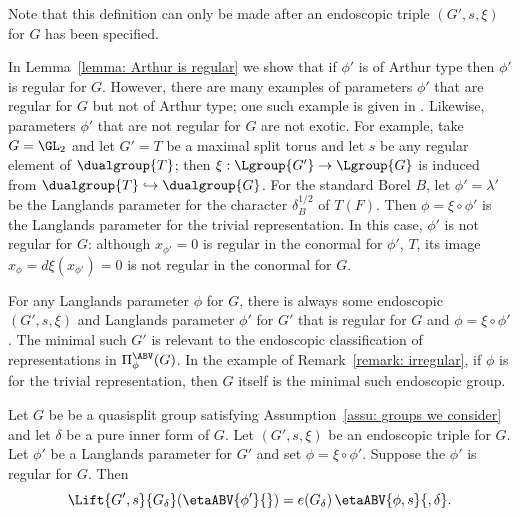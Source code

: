 \documentclass[11pt,letterpaper]{amsart}
\numberwithin{equation}{section}
\begin{document}
Note that this definition can only be made after an endoscopic triple $(G',s,\xi)$ for $G$ has been specified.


\begin{remark}\label{remark: irregular}
In Lemma~\ref{lemma: Arthur is regular} we show that if $\phi'$ is of Arthur type then $\phi'$ is regular for $G$.
However, there are many examples of parameters $\phi'$ that are regular for $G$ but not of Arthur type; one such example is given in \cite{CFK22}. 
Likewise, parameters $\phi'$ that are not regular for $G$ are not exotic.
For example, take $G= \GL_2$ and let $G'=T$ be a maximal split torus and let $s$ be any regular element of $\dualgroup{T}$; then $\xi : \Lgroup{G'} \to \Lgroup{G}$ is induced from $\dualgroup{T} \hookrightarrow \dualgroup{G}$.
For the standard Borel $B$, let $\phi' = \lambda'$ be the Langlands parameter for the character $\delta_B^{1/2}$ of $T(F)$.
Then $\phi = \xi\circ \phi'$ is the Langlands parameter for the trivial representation.
In this case, $\phi'$ is not regular for $G$: although $x_{\phi'} = 0$ is regular in the conormal for $\phi'$, $T$, its image $x_\phi = d\xi(x_{\phi'}) = 0$ is not regular in the conormal for $G$.
\end{remark}

\begin{remark}
    For any Langlands parameter $\phi$ for $G$, there is always some endoscopic $(G',s,\xi)$ and Langlands parameter $\phi'$ for $G'$ that is regular for $G$ and $\phi = \xi \circ \phi'$.
    The minimal such $G'$ is relevant to the endoscopic classification of representations in $\Pi^\ABV_\phi(G)$.
    In the example of Remark~\ref{remark: irregular}, if $\phi$ is for the trivial representation, then $G$ itself is the minimal such endoscopic group.
\end{remark}


\begin{theorem}\label{theorem: Lift of ABV}
Let $G$ be be a quasisplit group satisfying Assumption~\ref{assu: groups we consider} and let $\delta$ be a pure inner form of $G$.
Let $(G',s,\xi)$ be an endoscopic triple for $G$.
Let $\phi'$ be a Langlands parameter for $G'$ and set
$\phi = \xi\circ\phi'$.
Suppose the $\phi'$ is regular for $G$. 
Then
    \[
    \Lift{G',s}{G_\delta}
    (\etaABV{\phi'}{})
    =
    e(G_\delta)\,
    \etaABV{\phi,s}{,\delta}.   
    \]
\end{theorem}
\end{document}
